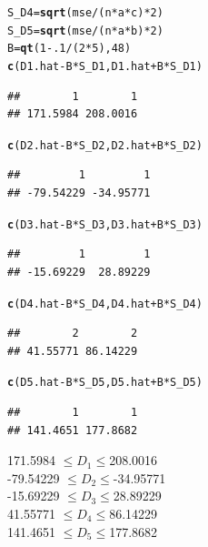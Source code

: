 \documentclass{article}\usepackage[]{graphicx}\usepackage[]{color}
\makeatletter
\newcommand{\hlnum}[1]{\textcolor[rgb]{0.686,0.059,0.569}{#1}}%
\newcommand{\hlopt}[1]{\textcolor[rgb]{0,0,0}{#1}}%
\newcommand{\hlstd}[1]{\textcolor[rgb]{0.345,0.345,0.345}{#1}}%
\newcommand{\hlkwb}[1]{\textcolor[rgb]{0.69,0.353,0.396}{#1}}%
\newcommand{\hlkwd}[1]{\textcolor[rgb]{0.737,0.353,0.396}{\textbf{#1}}}%
\newenvironment{kframe}{%
 \def\at@end@of@kframe{}%
 \ifinner\ifhmode%
  \def\at@end@of@kframe{\end{minipage}}%
  \begin{minipage}{\columnwidth}%
 \fi\fi%
 \def\FrameCommand##1{\hskip\@totalleftmargin \hskip-\fboxsep
 \colorbox{shadecolor}{##1}\hskip-\fboxsep
     \hskip-\linewidth \hskip-\@totalleftmargin \hskip\columnwidth}%
 \MakeFramed {\advance\hsize-\width
   \@totalleftmargin\z@ \linewidth\hsize
   \@setminipage}}%
 {\par\unskip\endMakeFramed%
 \at@end@of@kframe}
\newenvironment{knitrout}{}{} %
\makeatother
\begin{document}
\begin{enumerate}[(a)]
\begin{knitrout}
\begin{kframe}
\begin{alltt}
  \hlstd{S_D4} \hlkwb{=} \hlkwd{sqrt}\hlstd{(mse}\hlopt{/}\hlstd{(n}\hlopt{*}\hlstd{a}\hlopt{*}\hlstd{c)}\hlopt{*}\hlnum{2}\hlstd{)}
  \hlstd{S_D5} \hlkwb{=} \hlkwd{sqrt}\hlstd{(mse}\hlopt{/}\hlstd{(n}\hlopt{*}\hlstd{a}\hlopt{*}\hlstd{b)}\hlopt{*}\hlnum{2}\hlstd{)}
  \hlstd{B} \hlkwb{=} \hlkwd{qt}\hlstd{(}\hlnum{1}\hlopt{-}\hlnum{.1}\hlopt{/}\hlstd{(}\hlnum{2}\hlopt{*}\hlnum{5}\hlstd{),} \hlnum{48}\hlstd{)}
  \hlkwd{c}\hlstd{(D1.hat}\hlopt{-}\hlstd{B}\hlopt{*}\hlstd{S_D1, D1.hat}\hlopt{+}\hlstd{B}\hlopt{*}\hlstd{S_D1)}
\end{alltt}
\begin{verbatim}
##        1        1 
## 171.5984 208.0016
\end{verbatim}
\begin{alltt}
  \hlkwd{c}\hlstd{(D2.hat}\hlopt{-}\hlstd{B}\hlopt{*}\hlstd{S_D2, D2.hat}\hlopt{+}\hlstd{B}\hlopt{*}\hlstd{S_D2)}
\end{alltt}
\begin{verbatim}
##         1         1 
## -79.54229 -34.95771
\end{verbatim}
\begin{alltt}
  \hlkwd{c}\hlstd{(D3.hat}\hlopt{-}\hlstd{B}\hlopt{*}\hlstd{S_D3, D3.hat}\hlopt{+}\hlstd{B}\hlopt{*}\hlstd{S_D3)}
\end{alltt}
\begin{verbatim}
##         1         1 
## -15.69229  28.89229
\end{verbatim}
\begin{alltt}
  \hlkwd{c}\hlstd{(D4.hat}\hlopt{-}\hlstd{B}\hlopt{*}\hlstd{S_D4, D4.hat}\hlopt{+}\hlstd{B}\hlopt{*}\hlstd{S_D4)}
\end{alltt}
\begin{verbatim}
##        2        2 
## 41.55771 86.14229
\end{verbatim}
\begin{alltt}
  \hlkwd{c}\hlstd{(D5.hat}\hlopt{-}\hlstd{B}\hlopt{*}\hlstd{S_D5, D5.hat}\hlopt{+}\hlstd{B}\hlopt{*}\hlstd{S_D5)}
\end{alltt}
\begin{verbatim}
##        1        1 
## 141.4651 177.8682
\end{verbatim}
\end{kframe}
\end{knitrout}

\begin{center}
171.5984 $\leq D_1 \leq  $208.0016 \\
-79.54229 $\leq D_2 \leq  $-34.95771 \\
-15.69229 $\leq D_3 \leq  $28.89229 \\
41.55771 $\leq D_4 \leq  $86.14229 \\
141.4651 $\leq D_5 \leq  $177.8682 \\
\end{center}


\end{enumerate}
\end{document}
